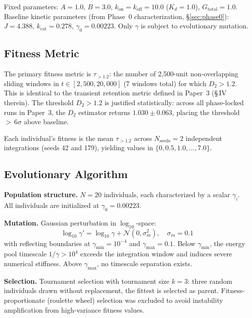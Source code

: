 \documentclass[twocolumn,showpacs,preprintnumbers,amsmath,amssymb,prd,floatfix]{revtex4-2}
\newcommand{\tauexp}{\tau_{>1.2}}
\newcommand{\Dtwo}{D_2}
\newcommand{\kcat}{k_{\mathrm{cat}}}
\newcommand{\Kd}{K_d}
\newcommand{\Gtot}{G_{\mathrm{total}}}
\begin{document}
Fixed parameters: $A = 1.0$, $B = 3.0$, $k_\text{on} = k_\text{off} = 10.0$ ($\Kd = 1.0$), $\Gtot = 1.0$. Baseline kinetic parameters (from Phase~0 characterization, \S\ref{sec:phase0}): $J = 4.388$, $\kcat = 0.278$, $\gamma_0 = 0.00223$. Only $\gamma$ is subject to evolutionary mutation.

\subsection{Fitness Metric}

The primary fitness metric is $\tauexp$: the number of 2{,}500-unit non-overlapping sliding windows in $t \in [2{,}500, 20{,}000]$ (7 windows total) for which $\Dtwo > 1.2$. This is identical to the transient retention metric defined in Paper~3 (\S\,IV therein). The threshold $\Dtwo > 1.2$ is justified statistically: across all phase-locked runs in Paper~3, the $\Dtwo$ estimator returns $1.030 \pm 0.063$, placing the threshold $>$\,6$\sigma$ above baseline.

Each individual's fitness is the mean $\tauexp$ across $N_\text{seeds} = 2$ independent integrations (seeds 42 and 179), yielding values in $\{0, 0.5, 1.0, \ldots, 7.0\}$.

\subsection{Evolutionary Algorithm}

\textbf{Population structure.} $N = 20$ individuals, each characterized by a scalar $\gamma_i$. All individuals are initialized at $\gamma_0 = 0.00223$.

\textbf{Mutation.} Gaussian perturbation in $\log_{10}$-space:
\begin{equation}
\log_{10} \gamma' = \log_{10} \gamma + \mathcal{N}(0, \sigma_m^2), \quad \sigma_m = 0.1
\end{equation}
with reflecting boundaries at $\gamma_\text{min} = 10^{-4}$ and $\gamma_\text{max} = 0.1$. Below $\gamma_\text{min}$, the energy pool timescale $1/\gamma > 10^4$ exceeds the integration window and induces severe numerical stiffness. Above $\gamma_\text{max}$, no timescale separation exists.

\textbf{Selection.} Tournament selection with tournament size $k = 3$: three random individuals drawn without replacement, the fittest is selected as parent. Fitness-proportionate (roulette wheel) selection was excluded to avoid instability amplification from high-variance fitness values.
\end{document}
